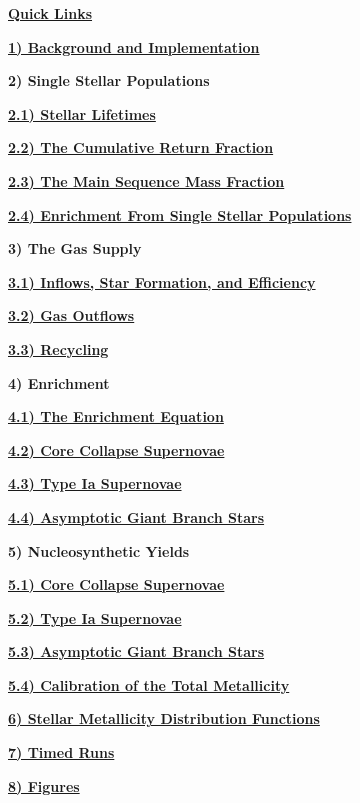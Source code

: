 \documentclass{report}
\begin{document}
\par\null\par\noindent 
\underline{\textbf{Quick Links}} 
\par\noindent 
\hyperlink{sec:background}{\textbf{1) Background and Implementation}} 
\par\noindent 
\textbf{2) Single Stellar Populations}
\par
\hyperlink{ssp:lifetimes}{\textbf{2.1) Stellar Lifetimes}} 
\par
\hyperlink{ssp:crf}{\textbf{2.2) The Cumulative Return Fraction}}
\par
\hyperlink{ssp:msmf}{\textbf{2.3) The Main Sequence Mass Fraction}} 
\par
\hyperlink{ssp:enrichment}{\textbf{2.4) Enrichment From Single Stellar 
Populations}} 
\par\noindent 
\textbf{3) The Gas Supply}
\par
\hyperlink{gas:inflows}{\textbf{3.1) Inflows, Star Formation, and Efficiency}}
\par 
\hyperlink{gas:outflows}{\textbf{3.2) Gas Outflows}} 
\par
\hyperlink{gas:recycling}{\textbf{3.3) Recycling}} 
\par\noindent 
\textbf{4) Enrichment}
\par
\hyperlink{enrichment:equation}{\textbf{4.1) The Enrichment Equation}}
\par
\hyperlink{enrichment:ccsne}{\textbf{4.2) Core Collapse Supernovae}} 
\par
\hyperlink{enrichment:sneia}{\textbf{4.3) Type Ia Supernovae}} 
\par
\hyperlink{enrichment:agb}{\textbf{4.4) Asymptotic Giant Branch Stars}} 
\par\noindent 
\textbf{5) Nucleosynthetic Yields}
\par
\hyperlink{yields:ccsne}{\textbf{5.1) Core Collapse Supernovae}} 
\par
\hyperlink{yields:sneia}{\textbf{5.2) Type Ia Supernovae}} 
\par
\hyperlink{yields:agb}{\textbf{5.3) Asymptotic Giant Branch Stars}} 
\par
\hyperlink{yields:zscale}{\textbf{5.4) Calibration of the Total Metallicity}}
\par\noindent 
\hyperlink{sec:mdfs}{\textbf{6) Stellar Metallicity Distribution Functions}}
\par\noindent 
\hyperlink{sec:tests}{\textbf{7) Timed Runs}}
\par\noindent 
\hyperlink{sec:figures}{\textbf{8) Figures}}
\end{document}
